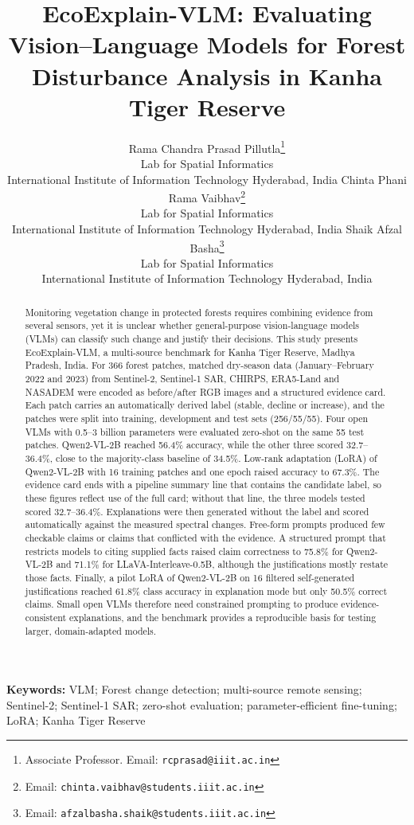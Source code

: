 \documentclass[11pt]{article}
\title{EcoExplain-VLM: Evaluating Vision--Language Models for
Forest Disturbance Analysis in Kanha Tiger Reserve}
\author{
Rama Chandra Prasad Pillutla\thanks{Associate Professor. Email:
\texttt{rcprasad@iiit.ac.in}} \\
Lab for Spatial Informatics \\
International Institute of Information Technology Hyderabad, India
\And
Chinta Phani Rama Vaibhav\thanks{Email:
\texttt{chinta.vaibhav@students.iiit.ac.in}} \\
Lab for Spatial Informatics \\
International Institute of Information Technology Hyderabad, India
\And
Shaik Afzal Basha\thanks{Email:
\texttt{afzalbasha.shaik@students.iiit.ac.in}} \\
Lab for Spatial Informatics \\
International Institute of Information Technology Hyderabad, India
}
\begin{document}
\maketitle


\begin{abstract}
Monitoring vegetation change in protected forests requires combining
evidence from several sensors, yet it is unclear whether general-purpose
vision-language models (VLMs) can classify such change and justify their
decisions. This study presents EcoExplain-VLM, a multi-source benchmark
for Kanha Tiger Reserve, Madhya Pradesh, India. For 366 forest patches,
matched dry-season data (January--February 2022 and 2023) from
Sentinel-2, Sentinel-1 SAR, CHIRPS, ERA5-Land and NASADEM were encoded
as before/after RGB images and a structured evidence card. Each patch
carries an automatically derived label (stable, decline or increase),
and the patches were split into training, development and test sets
(256/55/55). Four open VLMs with 0.5--3 billion parameters were
evaluated zero-shot on the same 55 test patches. Qwen2-VL-2B reached
56.4\% accuracy, while the other three scored 32.7--36.4\%, close to
the majority-class baseline of 34.5\%. Low-rank adaptation (LoRA) of
Qwen2-VL-2B with 16 training patches and one epoch raised accuracy to
67.3\%. The evidence card ends with a pipeline summary line that
contains the candidate label, so these figures reflect use of the full
card; without that line, the three models tested scored 32.7--36.4\%.
Explanations were then generated without the label and scored
automatically against the measured spectral changes. Free-form prompts
produced few checkable claims or claims that conflicted with the
evidence. A structured prompt that restricts models to citing supplied
facts raised claim correctness to 75.8\% for Qwen2-VL-2B and 71.1\%
for LLaVA-Interleave-0.5B, although the justifications mostly restate
those facts. Finally, a pilot LoRA of Qwen2-VL-2B on 16 filtered
self-generated justifications reached 61.8\% class accuracy in
explanation mode but only 50.5\% correct claims. Small open VLMs
therefore need constrained prompting to produce evidence-consistent
explanations, and the benchmark provides a reproducible basis for
testing larger, domain-adapted models.
\end{abstract}

\noindent
\textbf{Keywords:} VLM; Forest change detection; multi-source remote
sensing; Sentinel-2; Sentinel-1 SAR; zero-shot evaluation;
parameter-efficient fine-tuning; LoRA; Kanha Tiger Reserve
\end{document}
